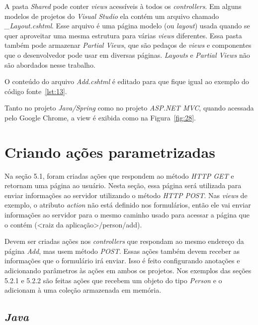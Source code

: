A pasta \textit{Shared} pode conter \textit{views} acessíveis à todos os \textit{controllers}. Em alguns modelos de projetos do \textit{Visual Studio} ela contém um arquivo chamado \textit{\_Layout.cshtml}. Esse arquivo é uma página modelo (ou \textit{layout}) usada quando se quer aproveitar uma mesma estrutura para várias \textit{views} diferentes. Essa pasta também pode armazenar \textit{Partial Views}, que são pedaços de \textit{views} e componentes que o desenvolvedor pode usar em diversas páginas. \textit{Layouts} e \textit{Partial Views} não são abordados nesse trabalho.

O conteúdo do arquivo \textit{Add.cshtml} é editado para que fique igual ao exemplo do código fonte~\ref{lst:13}.


Tanto no projeto \textit{Java/Spring} como no projeto \textit{ASP.NET MVC}, quando acessada pelo Google Chrome, a view é exibida como na Figura~\ref{fig:28}. 


\section{Criando ações parametrizadas}

Na seção 5.1, foram criadas ações que respondem ao método \textit{HTTP GET} e retornam uma página ao usuário. Nesta seção, essa página será utilizada para enviar informações ao servidor utilizando o método \textit{HTTP POST}. Nas \textit{views} de exemplo, o atributo \textit{action} não está definido nos formulários, então ele vai enviar informações ao servidor para o mesmo caminho usado para acessar a página que o contém (<raiz da aplicação>/person/add).

Devem ser criadas ações nos \textit{controllers} que respondam ao mesmo endereço da página \textit{Add}, mas usem método \textit{POST}. Essas ações também devem receber as informações que o formulário irá enviar. Isso é feito configurando anotações e adicionando parâmetros às ações em ambos os projetos. Nos exemplos das seções 5.2.1 e 5.2.2 são feitas ações que recebem um objeto do tipo \textit{Person} e o adicionam à uma coleção armazenada em memória.

\subsection{\textit{Java}}

